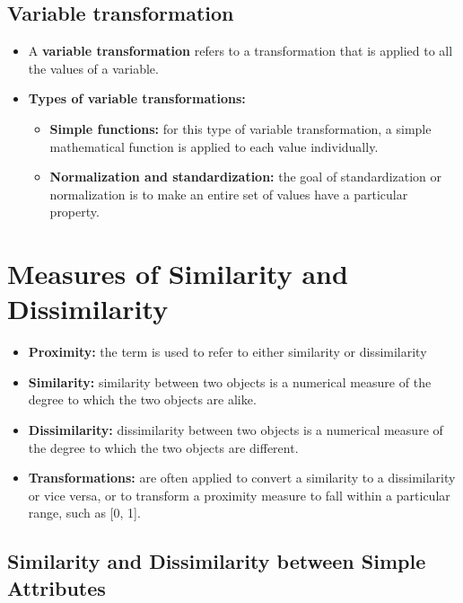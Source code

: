 	\subsection{Variable transformation}
		\begin{itemize}
			\item A {\bf variable transformation} refers to a transformation that is applied to
			all the values of a variable. 
			\item{\bf Types of variable transformations:}
				\begin{itemize}
					\item{\bf Simple functions:} for this type of variable transformation, a 
					simple mathematical function is applied to each value individually. 
					\item{\bf Normalization and standardization:} the goal of standardization 
					or normalization is to make an entire set of values have a particular 
					property. 
				\end{itemize}
		\end{itemize}

\clearpage
\section{Measures of Similarity and Dissimilarity}

	\begin{itemize}
		\item {\bf Proximity:} the term is used to refer to either similarity or dissimilarity
		\item {\bf Similarity:} similarity between two objects is a numerical measure of the degree 
		to which the two objects are alike.
		\item{\bf Dissimilarity:} dissimilarity between two objects is a numerical measure of the 
		degree to which the two objects are different.
		\item {\bf Transformations:} are often applied to convert a similarity to a dissimilarity
		or vice versa, or to transform a proximity measure to fall within a particular range,
		such as [0, 1].
	\end{itemize}

	\subsection{Similarity and Dissimilarity between Simple Attributes}


